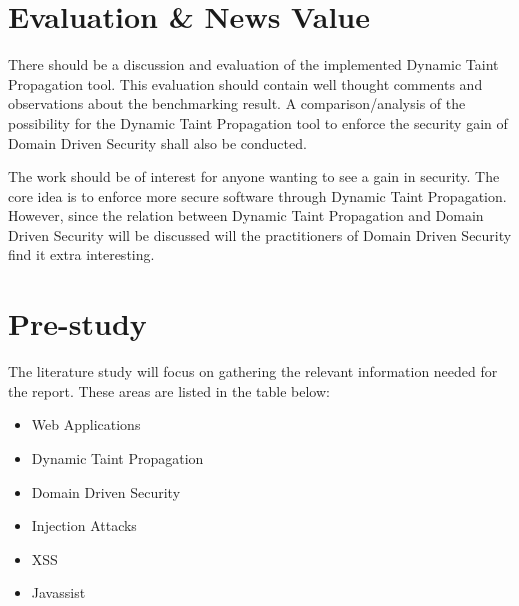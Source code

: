 \documentclass{../kththesis}
\begin{document}
\chapter{Evaluation \& News Value}
There should be a discussion and evaluation of the implemented Dynamic Taint Propagation tool. This evaluation should contain well thought comments and observations about the benchmarking result. A comparison/analysis of the possibility for the Dynamic Taint Propagation tool to enforce the security gain of Domain Driven Security shall also be conducted. 

The work should be of interest for anyone wanting to see a gain in security. The core idea is to enforce more secure software through Dynamic Taint Propagation. However, since the relation between Dynamic Taint Propagation and Domain Driven Security will be discussed will the practitioners of Domain Driven Security find it extra interesting.



\chapter{Pre-study}
The literature study will focus on gathering the relevant information needed for the report. These areas are listed in the table below:
	
	\begin{itemize}  
		\item Web Applications
		\item Dynamic Taint Propagation
		\item Domain Driven Security
		\item Injection Attacks
		\item XSS
		\item Javassist
	\end{itemize}
\end{document}
